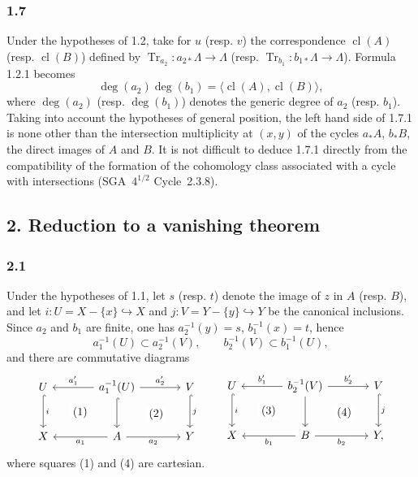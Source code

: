 \documentclass[11pt]{article}
\providecommand{\cl}{\operatorname{cl}}
\providecommand{\Tr}{\operatorname{Tr}}
\providecommand{\Tr}{\operatorname{Tr}}
\providecommand{\Tr}{\operatorname{Tr}}
\providecommand{\Tr}{\operatorname{Tr}}
\providecommand{\cl}{\operatorname{cl}}
\providecommand{\cl}{\operatorname{cl}}
\providecommand{\Tr}{\operatorname{Tr}}
\begin{document}
\subsubsection*{1.7}
Under the hypotheses of 1.2, take for $u$ (resp. $v$) the correspondence $\cl(A)$ (resp. $\cl(B)$) defined by $\Tr_{a_2}:a_{2*}\Lambda\to\Lambda$ (resp. $\Tr_{b_1}:b_{1*}\Lambda\to\Lambda$). Formula 1.2.1 becomes
\begin{equation}\tag{1.7.1}
\deg(a_2)\deg(b_1)=\langle \cl(A),\cl(B)\rangle,
\end{equation}
where $\deg(a_2)$ (resp. $\deg(b_1)$) denotes the generic degree of $a_2$ (resp. $b_1$). Taking into account the hypotheses of general position, the left hand side of 1.7.1 is none other than the intersection multiplicity at $(x,y)$ of the cycles $a_*A$, $b_*B$, the direct images of $A$ and $B$. It is not difficult to deduce 1.7.1 directly from the compatibility of the formation of the cohomology class associated with a cycle with intersections (SGA~$4^{1/2}$ Cycle~2.3.8).


\subsection*{2. Reduction to a vanishing theorem}

\subsubsection*{2.1}
Under the hypotheses of 1.1, let $s$ (resp. $t$) denote the image of $z$ in $A$ (resp. $B$), and let $i:U=X-\{x\}\hookrightarrow X$ and $j:V=Y-\{y\}\hookrightarrow Y$ be the canonical inclusions. Since $a_2$ and $b_1$ are finite, one has $a_2^{-1}(y)=s$, $b_1^{-1}(x)=t$, hence
\[
a_1^{-1}(U)\subset a_2^{-1}(V),\qquad b_2^{-1}(V)\subset b_1^{-1}(U),
\]
and there are commutative diagrams
\[
\begin{tikzcd}[column sep=large,row sep=large]
U \arrow[d,hook,"i"] \arrow[rd,phantom,"(1)"{description}] & a_1^{-1}(U) \arrow[l,"a'_1"'] \arrow[r,"a'_2"] \arrow[d,hook] \arrow[rd,phantom,"(2)"{description}] & V \arrow[d,hook,"j"]\\
X & A \arrow[l,"a_1"] \arrow[r,"a_2"'] & Y
\end{tikzcd}
\qquad
\begin{tikzcd}[column sep=large,row sep=large]
U \arrow[d,hook,"i"] \arrow[rd,phantom,"(3)"{description}] & b_2^{-1}(V) \arrow[l,"b'_1"'] \arrow[r,"b'_2"] \arrow[d] \arrow[rd,phantom,"(4)"{description}] & V \arrow[d,hook,"j"]\\
X & B \arrow[l,"b_1"] \arrow[r,"b_2"'] & Y ,
\end{tikzcd}
\]
where squares (1) and (4) are cartesian.
\end{document}
